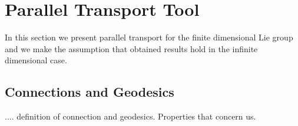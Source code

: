 
\chapter{Parallel Transport Tool}\label{ch:parallel_transport}

In this section we present parallel transport for the finite dimensional Lie group and we make the assumption that obtained results hold in the infinite dimensional case.




\section{Connections and Geodesics}

.... definition of connection and geodesics. Properties that concern us.

